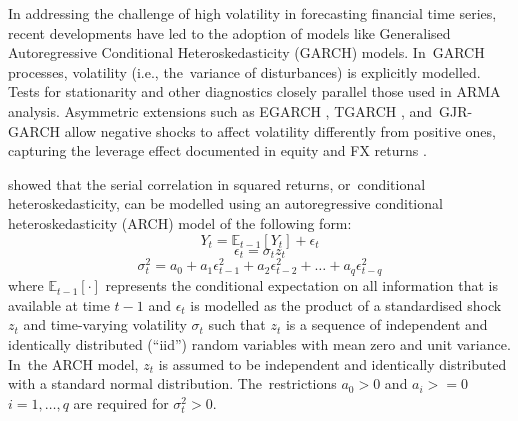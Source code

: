 \documentclass[risks,article,accept,pdftex,moreauthors]{Definitions/mdpi}
\providecommand{\E}{\mathbb{E}}
\begin{document}
In addressing the challenge of high volatility in forecasting financial time series, recent developments have led to the adoption of models like Generalised Autoregressive Conditional Heteroskedasticity (GARCH) models. In~GARCH processes, volatility (i.e., the~variance of disturbances) is explicitly modelled. Tests for stationarity and other diagnostics closely parallel those used in ARMA analysis. Asymmetric extensions such as EGARCH \citep{nelson1991conditional}, TGARCH \citep{zakoian1994threshold}, and~GJR-GARCH \citep{glosten1993relation} allow negative shocks to affect volatility differently from positive ones, capturing the leverage effect documented in equity and FX returns \citep{black1976studies, christie1982stochastic, cont2001empirical}.

\cite{engle1982autoregressive} showed that the serial correlation in squared returns, or~conditional heteroskedasticity, can be modelled using an autoregressive conditional heteroskedasticity (ARCH) model {of the following form:} %
\begin{equation}
Y_t = \E_{t-1}[Y_t] + \epsilon_t
\end{equation}
\begin{equation}
\epsilon_t = \sigma_t z_t
\end{equation}
\begin{equation}
\sigma_t^2 = a_0 + a_1 \epsilon_{t-1}^2 + a_2 \epsilon_{t-2}^2 + \dots + a_q \epsilon_{t-q}^2  
\end{equation}
where \(\E_{t-1}[\cdot]\) represents the conditional expectation on all information that is available at time \(t-1\) and \(\epsilon_t\) is modelled as the product of a standardised shock \(z_t\) and time-varying volatility \(\sigma_t\) such that \(z_t\) is a sequence of independent and identically distributed (“iid”) random variables with mean zero and unit variance. In~the ARCH model, \(z_t\) is assumed to be independent and identically distributed with a standard normal distribution. The~restrictions \(a_0 > 0\) and \(a_i >= 0\) \(i = 1,\ldots,q\) are required for \(\sigma_t^2 > 0\).\\
\end{document}
